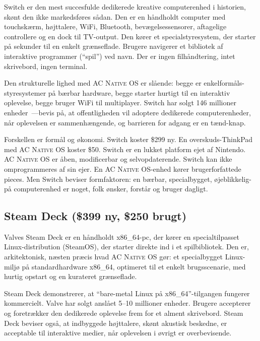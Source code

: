 \documentclass[10pt,letterpaper,twocolumn]{article}
\newcommand{\acos}{\textsc{AC Native OS}}
\begin{document}
Switch er den mest succesfulde dedikerede kreative computerenhed i historien, sk{\o}nt den ikke markedsf{\o}res s{\aa}dan. Den er en h{\aa}ndholdt computer med touchsk{\ae}rm, h{\o}jttalere, WiFi, Bluetooth, bev{\ae}gelsessensorer, aftagelige controllere og en dock til TV-output. Den k{\o}rer et specialstyresystem, der starter p{\aa} sekunder til en enkelt gr{\ae}nseflade. Brugere navigerer et bibliotek af interaktive programmer (``spil'') ved navn. Der er ingen filh{\aa}ndtering, intet skrivebord, ingen terminal.

Den strukturelle lighed med \acos{} er sl{\aa}ende: begge er enkelform{\aa}ls-styresystemer p{\aa} b{\ae}rbar hardware, begge starter hurtigt til en interaktiv oplevelse, begge bruger WiFi til multiplayer. Switch har solgt 146 millioner enheder~\citep{nintendo2024earnings}---bevis p{\aa}, at offentligheden vil adoptere dedikerede computerenheder, n{\aa}r oplevelsen er sammenh{\ae}ngende, og barrieren for adgang er en t{\ae}nd-knap.

Forskellen er form{\aa}l og {\o}konomi. Switch koster \$299 ny. En overskuds-ThinkPad med \acos{} koster \$50. Switch er en lukket platform ejet af Nintendo. \acos{} er {\aa}ben, modificerbar og selvopdaterende. Switch kan ikke omprogrammeres af sin ejer. En \acos{}-enhed k{\o}rer brugerforfattede pieces. Men Switch beviser formfaktoren: en b{\ae}rbar, specialbygget, {\o}jeblikkelig-p{\aa} computerenhed er noget, folk {\o}nsker, forst{\aa}r og bruger dagligt.

\subsection{Steam Deck (\$399 ny, \$250 brugt)}

Valves Steam Deck er en h{\aa}ndholdt x86\_64-pc, der k{\o}rer en specialtilpasset Linux-distribution (SteamOS), der starter direkte ind i et spilbibliotek. Den er, arkitektonisk, n{\ae}sten pr{\ae}cis hvad \acos{} g{\o}r: et specialbygget Linux-milj{\o} p{\aa} standardhardware x86\_64, optimeret til et enkelt brugsscenarie, med hurtig opstart og en kurateret gr{\ae}nseflade.

Steam Deck demonstrerer, at ``bare-metal Linux p{\aa} x86\_64''-tilgangen fungerer kommercielt. Valve har solgt ansl{\aa}et 5--10 millioner enheder. Brugere accepterer og foretr{\ae}kker den dedikerede oplevelse frem for et alment skrivebord. Steam Deck beviser ogs{\aa}, at indbyggede h{\o}jttalere, sk{\o}nt akustisk beskedne, er acceptable til interaktive medier, n{\aa}r oplevelsen i {\o}vrigt er overbevisende.
\end{document}
